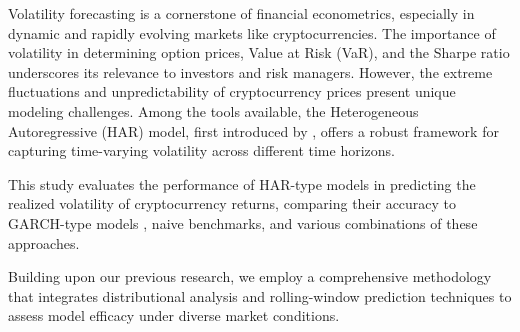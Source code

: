 

\par 

Volatility forecasting is a cornerstone of financial econometrics, especially in dynamic and rapidly evolving markets like cryptocurrencies. The importance of volatility in determining option prices, Value at Risk (VaR), and the Sharpe ratio underscores its relevance to investors and risk managers. However, the extreme fluctuations and unpredictability of cryptocurrency prices present unique modeling challenges. Among the tools available, the Heterogeneous Autoregressive (HAR) model, first introduced by \cite{corsi2009}, offers a robust framework for capturing time-varying volatility across different time horizons.

This study evaluates the performance of HAR-type models in predicting the realized volatility of cryptocurrency returns, comparing their accuracy to GARCH-type models \cite{bollerslev1987}, naive benchmarks, and various combinations of these approaches.

Building upon our previous research, we employ a comprehensive methodology that integrates distributional analysis and rolling-window prediction techniques to assess model efficacy under diverse market conditions.
